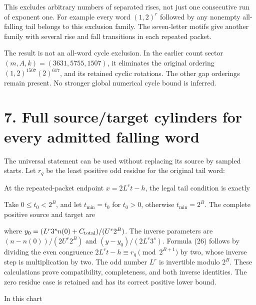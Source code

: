 This excludes arbitrary numbers of separated rises, not just one
consecutive run of exponent one. For example every word \((1,2)^r\)
followed by any nonempty all-falling tail belongs to this exclusion
family. The seven-letter motifs give another family with several rise
and fall transitions in each repeated packet.

The result is not an all-word cycle exclusion. In the earlier count
sector \((m,A,k)=(3631,5755,1507)\), it eliminates the original ordering
\((1,2)^{1507}(2)^{617}\), and its retained cyclic rotations. The other
gap orderings remain present. No stronger global numerical cycle bound
is inferred.

\section{7. Full source/target cylinders for every admitted falling
word}

The universal statement can be used without replacing its source by
sampled starts. Let \(r_q\) be the least positive odd residue for the
original tail word:


At the repeated-packet endpoint \(x=2L^rt-h\), the legal tail condition
is exactly


Take \(0\le t_0<2^B\), and let \(t_{\min}=t_0\) for \(t_0>0\), otherwise
\(t_{\min}=2^B\). The complete positive source and target are


where \(y_0=(L^r3^s n(0)+C_{\rm total})/(U^r2^B)\). The inverse
parameters are \((n-n(0))/(2U^r2^B)\) and \((y-y_0)/(2L^r3^s)\). Formula
(26) follows by dividing the even congruence
\(2L^rt-h\equiv r_q\pmod{2^{B+1}}\) by two, whose inverse step is
multiplication by two. The odd number \(L^r\) is invertible modulo
\(2^B\). These calculations prove compatibility, completeness, and both
inverse identities. The zero residue case is retained and has its
correct positive lower bound.

In this chart


